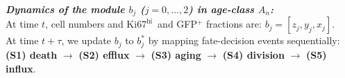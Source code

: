 \documentclass[11pt]{article}
\newcommand{\khi}{\ensuremath{\text{Ki67}^\text{hi}}~}
\begin{document}
\begin{mybox}
\textbf{\textit{Dynamics of the module $b_j$ ($j = 0,\ldots,2$) in age-class $A_n$:}} \\

\vspace{-3mm}
At time $t$, cell numbers and \khi and GFP$^+$ fractions are: $b_j = [z_j, y_j, x_j]$. \\
At time $t+\tau$, we update $b_j$ to $b_j^*$  by mapping fate-decision events sequentially:\\
\textbf{(S1) death} $\rightarrow$ 
\textbf{(S2) efflux} $\rightarrow$ 
\textbf{(S3) aging} $\rightarrow$ 
\textbf{(S4) division} $\rightarrow$ 
\textbf{(S5) influx}.


\end{mybox}
\end{document}
